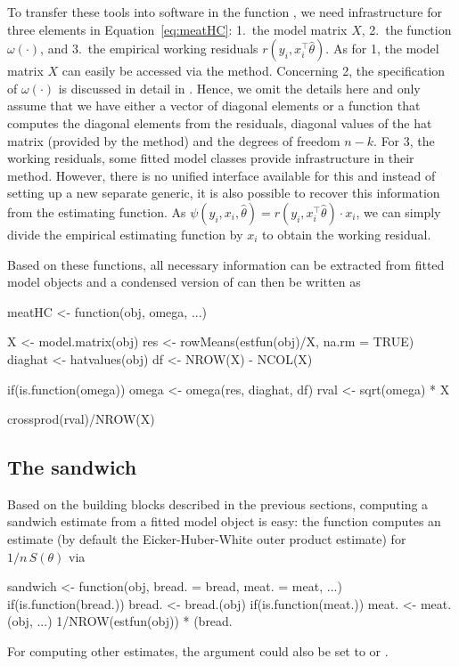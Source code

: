 \documentclass{Z}
\begin{document}
To transfer these tools into software in the function , we need infrastructure
for three elements in Equation~\ref{eq:meatHC}: 1.~the model matrix $X$, 2.~the function $\omega(\cdot)$,
and 3.~the empirical working residuals $r(y_i, x_i^\top \hat \theta)$. As for 1, the model matrix $X$ can
easily be accessed via the  method. Concerning 2, the specification of $\omega(\cdot)$
is discussed in detail in \cite{hac:Zeileis:2004a}. Hence, we omit the details here and only assume
that we have either a vector  of diagonal elements or a function  that
computes the diagonal elements from the residuals, diagonal values of the hat matrix (provided
by the  method) and the degrees of freedom $n-k$.
For 3, the working residuals, some fitted model classes provide infrastructure in their 
method. However, there is no unified interface available for this and instead of setting up
a new separate generic, it is also possible to recover this information from the estimating function.
As $\psi(y_i, x_i, \hat \theta) = r(y_i, x_i^\top \hat \theta) \cdot x_i$, we can simply 
divide the empirical estimating function by $x_i$ to obtain the working residual.

Based on these functions, all necessary information can be extracted from fitted model
objects and a condensed version of  can then be written as
\begin{Schunk}
\begin{Sinput}
meatHC <- function(obj, omega, ...)
{
  X <- model.matrix(obj)
  res <- rowMeans(estfun(obj)/X, na.rm = TRUE)
  diaghat <- hatvalues(obj)
  df <- NROW(X) - NCOL(X)  
  
  if(is.function(omega)) omega <- omega(res, diaghat, df)
  rval <- sqrt(omega) * X
  
  crossprod(rval)/NROW(X)
}
\end{Sinput}
\end{Schunk}

\subsection{The sandwich}

Based on the building blocks described in the previous sections, computing a
sandwich estimate from a fitted model object is easy: the
function  computes an estimate (by default the Eicker-Huber-White
outer product estimate) for $1/n \, S(\theta)$ via
\begin{Schunk}
\begin{Sinput}
sandwich <- function(obj, bread. = bread, meat. = meat, ...)
{
  if(is.function(bread.)) bread. <- bread.(obj)
  if(is.function(meat.)) meat. <- meat.(obj, ...)
  1/NROW(estfun(obj)) * (bread. %*% meat. %*% bread.)
}
\end{Sinput}
\end{Schunk}
For computing other estimates, the argument  could also be set to
 or . 
\end{document}

